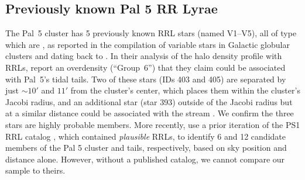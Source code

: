 \documentclass[twocolumn]{aastex63}
\newcommand{\sa}[1]{{\color{teal} SP: #1}}
\begin{document}





\subsection{Previously known Pal 5 RR Lyrae}

The Pal~5 cluster has 5 previously known RRL stars (named V1--V5), all of type which are \typec, as reported in the \citet{Clement:2001} compilation of variable stars in Galactic globular clusters and dating back to \citet{SawyerHogg:1973}.
In their analysis of the halo density profile with RRLs, \citet{Vivas:2006} report an overdensity (``Group~6'') that they claim could be associated with Pal~5's tidal tails.
Two of these stars (IDs 403 and 405) are separated by just $\sim10'$ and $11'$ from the cluster's center, which places them within the cluster's Jacobi radius, and an additional star (star 393) outside of the Jacobi radius but at a similar distance could be associated with the stream \citep{Vivas:2006}. We confirm the three stars are highly probable members. More recently, \citet{Ibata:2017} use a prior iteration of the PS1 RRL catalog \citep{Hernitschek:2016}, which contained \emph{plausible} RRLs, to identify 6 and 12 candidate members of the Pal 5 cluster and tails, respectively, based on sky position and distance alone. However, without a published catalog, we cannot compare our sample to theirs.
\end{document}
